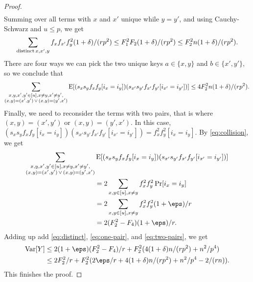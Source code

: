 \begin{proof}
\begin{align*}
    \end{align*}    
    Summing over all terms with $x$ and $x'$ unique while $y=y'$, and
    using Cauchy-Schwarz and $u\leq p$, we get 
    \begin{align*}
        \sum_{{\rm distinct}\,x,x',y} f_xf_{x'}f_y^2 (1 + \delta) /(rp^2) 
            \le F_1^2 F_2 (1 + \delta)/(rp^2)
            \le F_2^2 n(1 + \delta)/(rp^2).
    \end{align*}
    There are four ways we can pick the two unique keys $a\in \{x,y\}$
    and $b\in \{x',y'\}$, so we conclude that
    \begin{equation}\label{eq:one-pair}
        \sum_{\substack{
            x,y,x',y'\in[u], x\neq y, x'\neq y',\\
            (x,y)=(x',y')\,\vee\,(x,y)=(y',x')
        }}
        \operatorname*{E}[(s_x s_y f_x f_y [i_x = i_y]) (s_{x'} s_{y'} f_{x'} f_{y'}[i_{x'} = i_{y'}])]
            \le 4 F_2^2 n(1 + \delta)/(rp^2) .
    \end{equation}
    Finally, we need to reconsider the terms with two pairs, that
    is where $(x,y)=(x',y')$ or $(x,y)=(y',x')$. In
    this case, $(s_x s_y f_x f_y [i_x = i_y]) (s_{x'} s_{y'} f_{x'} f_{y'}[i_{x'} = i_{y'}]) = f_x^2 f_y^2 [i_x = i_y]$.
    By \cref{eq:collision}, we get 
    \begin{equation}\begin{split}    
        \sum_{\substack{
            x,y,x',y'\in[u], x\neq y, x'\neq y',\\
            (x,y)=(x',y')\,\vee\,(x,y)=(y',x')
        }}&
            \E[(s_x s_y f_x f_y [i_x = i_y]) (s_{x'} s_{y'} f_{x'} f_{y'}[i_{x'} = i_{y'}])]
            \\&=2\sum_{x,y\in[u],x\neq y} f_x^2f_y^2 \Pr[i_x=i_y]
            \\&=2\sum_{x,y\in[u],x\neq y} f_x^2f_y^2 (1 + \eps)/r
            \\&=2(F_2^2 - F_4)(1 + \eps)/r .\label{eq:two-pairs}
    \end{split}\end{equation}
    Adding up add \eqref{eq:distinct}, \eqref{eq:one-pair}, and
    \eqref{eq:two-pairs}, we get 
    \begin{align*}
        \Var[Y]
            &\le 2(1 + \eps)(F_2^2 - F_4)/r + F_2^2(4(1 + \delta) n / (rp^2) + n^2/p^4)
            \\&\le 2F_2^2/r + F_2^2 (2\eps/r + 4(1 + \delta)n / (rp^2) + n^2/p^4 - 2 /(rn)) .
    \end{align*}
    This finishes the proof.
\end{proof}

